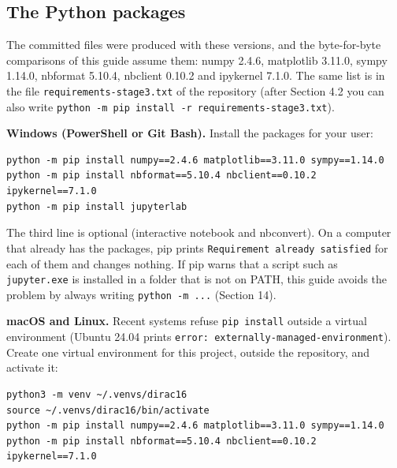 \documentclass[11pt]{article}
\begin{document}
\subsection{The Python packages}

The committed files were produced with these versions, and the byte-for-byte comparisons of this guide assume them: numpy 2.4.6, matplotlib 3.11.0, sympy 1.14.0, nbformat 5.10.4, nbclient 0.10.2 and ipykernel 7.1.0. The same list is in the file \texttt{requirem\allowbreak{}ents-sta\allowbreak{}ge3.txt} of the repository (after Section 4.2 you can also write \texttt{python -\allowbreak{}m pip in\allowbreak{}stall -r\allowbreak{} require\allowbreak{}ments-st\allowbreak{}age3.txt}).

\textbf{Windows (PowerShell or Git Bash).} Install the packages for your user:

\begin{Verbatim}[fontsize=\small]
python -m pip install numpy==2.4.6 matplotlib==3.11.0 sympy==1.14.0
python -m pip install nbformat==5.10.4 nbclient==0.10.2 ipykernel==7.1.0
python -m pip install jupyterlab
\end{Verbatim}

The third line is optional (interactive notebook and nbconvert). On a computer that already has the packages, pip prints \texttt{Requirem\allowbreak{}ent alre\allowbreak{}ady sati\allowbreak{}sfied} for each of them and changes nothing. If pip warns that a script such as \texttt{jupyter.\allowbreak{}exe} is installed in a folder that is not on PATH, this guide avoids the problem by always writing \texttt{python -\allowbreak{}m ...} (Section 14).

\textbf{macOS and Linux.} Recent systems refuse \texttt{pip inst\allowbreak{}all} outside a virtual environment (Ubuntu 24.04 prints \texttt{error: e\allowbreak{}xternall\allowbreak{}y-manage\allowbreak{}d-enviro\allowbreak{}nment}). Create one virtual environment for this project, outside the repository, and activate it:

\begin{Verbatim}[fontsize=\small]
python3 -m venv ~/.venvs/dirac16
source ~/.venvs/dirac16/bin/activate
python -m pip install numpy==2.4.6 matplotlib==3.11.0 sympy==1.14.0
python -m pip install nbformat==5.10.4 nbclient==0.10.2 ipykernel==7.1.0
\end{Verbatim}
\end{document}
